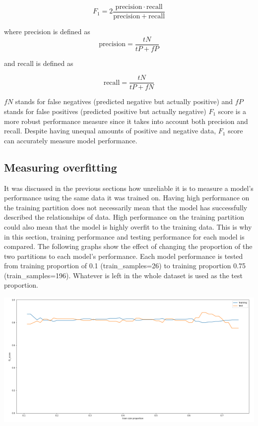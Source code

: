 \documentclass[]{report}
\begin{document}
\begin{equation} F_1 =2 \frac{\mathrm{precision}\cdot \mathrm{recall}}{\mathrm{precision} + \mathrm{recall}}  \end{equation}

where precision is defined as\\

\begin{equation} \mathrm{precision} =\frac{tN}{tP+fP}  \end{equation}

and recall is defined as

\begin{equation} \mathrm{recall} =\frac{tN}{tP+fN}  \end{equation}

\(fN\) stands for false negatives (predicted negative but actually
positive) and \(fP\) stands for false positives (predicted positive but
actually negative) \(F_1\) score is a more robust performance measure
since it takes into account both precision and recall. Despite having
unequal amounts of positive and negative data, \(F_1\) score can
accurately measure model performance.

\subsection{Measuring overfitting}\label{measuring-overfitting}

It was discussed in the previous sections how unreliable it is to
measure a model's performance using the same data it was trained on.
Having high performance on the training partition does not necessarily
mean that the model has successfully described the relationships of
data. High performance on the training partition could also mean that
the model is highly overfit to the training data. This is why in this
section, training performance and testing performance for each model is
compared. The following graphs show the effect of changing the
proportion of the two partitions to each model's performance. Each model
performance is tested from training proportion of 0.1
(train\_samples=26) to training proportion 0.75 (train\_samples=196).
Whatever is left in the whole dataset is used as the test proportion.

\includegraphics{images/bayesCV.png}
\end{document}
